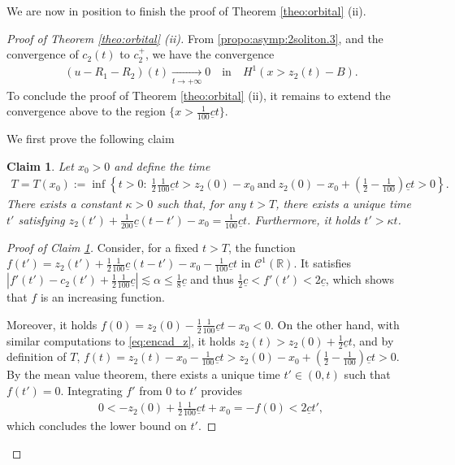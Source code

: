\documentclass[reqno,10pt]{amsart}
\newtheorem{claim}[lemm]{Claim}
\numberwithin{equation}{section}
\begin{document}
We are now in position to finish the proof of Theorem \ref{theo:orbital} (ii). 
\begin{proof}[Proof of Theorem \ref{theo:orbital} (ii)] From \eqref{propo:asymp:2soliton.3},
and the convergence of $c_2(t)$ to $c_2^+$, we have the convergence 
\begin{align} \label{conv:left:sol2}
\left( u - R_1 -R_2 \right) (t) \underset{t\rightarrow +\infty}{\rightarrow} 0 \quad \text{in} \quad H^1(x >z_2(t)-B) .
\end{align}
To conclude the proof of Theorem \ref{theo:orbital} (ii), it remains to extend the convergence above to the region $\{x >\frac1{100}\underline{c}t\}$. 

We first prove the following claim
\begin{claim}\label{claim:existence_t'}
	Let $x_0>0$ and define the time
	\begin{align*}
		T=T(x_0):= \inf \left\{ t>0 : \ \frac12 \frac{1}{100} \underline{c} t > z_2(0)-x_0 \ \text{and} \ z_2(0)-x_0+(\frac12 - \frac{1}{100} ) \underline{c}t>0 \right\}.
	\end{align*}
	There exists a constant $\kappa>0$ such that, for any $t>T$, there exists a unique time $t'$ satisfying $ z_2(t') + \frac{1}{200} \underline{c} (t-t') -x_0 = \frac{1}{100} \underline{c} t$.
	Furthermore, it holds $t'>\kappa t$.
\end{claim}

\begin{proof}[Proof of Claim \ref{claim:existence_t'}]
	Consider, for a fixed $t>T$, the function $f(t')= z_2(t')+ \frac12 \frac{1}{100} \underline{c} (t-t') - x_0 - \frac{1}{100} \underline{c} t$ in $\mathcal{C}^1(\mathbb{R})$. It satisfies $\left\vert f'(t')- c_2(t') + \frac12 \frac{1}{100} \underline{c} \right\vert \lesssim \alpha \leq \frac18 \underline{c}$ and thus $ \frac12 \underline{c} < f'(t') < 2 \underline{c}$, which shows that $f$ is an increasing function. 
	
	Moreover, it holds $f(0) =z_2(0)-\frac12 \frac{1}{100} \underline{c} t-x_0<0$. On the other hand, with similar computations to \eqref{eq:encad_z}, it holds $z_2(t)> z_2(0) + \frac12 \underline{c}t$, and by definition of $T$, $f(t)= z_2(t)-x_0 - \frac1{100} \underline{c} t >z_2(0)-x_0+(\frac12 - \frac1{100}) \underline{c}t>0$. By the mean value theorem, there exists a unique time $t'\in (0,t)$ such that $f(t')=0$. Integrating $f'$ from $0$ to $t'$ provides
	\begin{align*}
		0<-z_2(0) + \frac12 \frac1{100} \underline{c} t +x_0 =-f(0) < 2 \underline{c} t',
	\end{align*} 
	which concludes the lower bound on $t'$.
\end{proof}


\end{proof}
\end{document}
